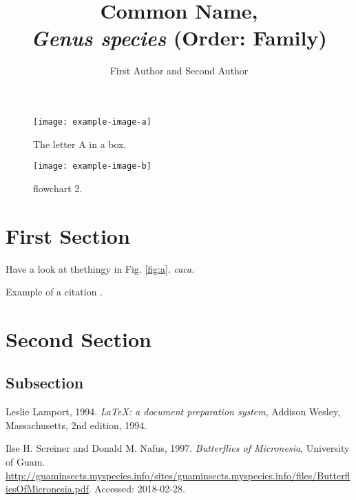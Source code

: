 \documentclass[twocolumn, letterpaper]{scrartcl}
\begin{document}
    \title{\color{triton_green}Common Name,\\ \textit{Genus species} (Order: Family)}
    \author{First Author and Second Author}
    \date{}

	\maketitle
	\lipsum[1]
	
	\begin{figure}[tbp]
		\texttt{[image: example-image-a]}
		\caption{The letter A in a box. \label{fig:a}}
		\vspace{0.1in}
		\texttt{[image: example-image-b]}
		\caption{flowchart 2. \label{fig:b}}
	\end{figure}	
    
    \section*{First Section}
    	Have a look at thethingy in Fig. \ref{fig:a}. \textit{caca}.
   
    	Example of a citation \cite{schreiner97}.
    
    	\lipsum[1]
        
    \section*{Second Section}

	\lipsum[2]
    
    \subsection*{Subsection}
    \lipsum[3-6]

    
    
    \begin{thebibliography}{9}

    	Leslie Lamport, 1994.
    	\textit{\LaTeX: a document preparation system},
    	Addison Wesley, Massachusetts, 2nd edition, 1994.
        
        Ilse H. Screiner and Donald M. Nafus, 1997.
        \textit{Butterflies of Micronesia},
        University of Guam.     			\url{http://guaminsects.myspecies.info/sites/guaminsects.myspecies.info/files/ButterfliesOfMicronesia.pdf}. Accessed: 2018-02-28.

    \end{thebibliography}
    
	\blurb
\end{document}
